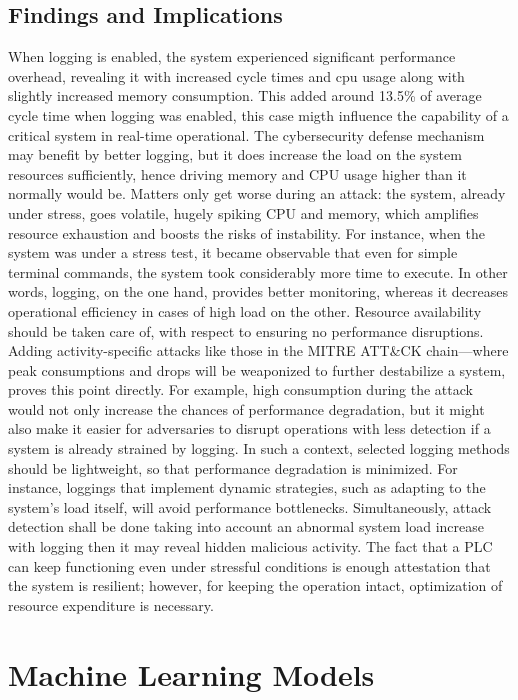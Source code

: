 \documentclass[Master,BMR,english]{twbook}
\begin{document}
\subsection{Findings and Implications}

When logging is enabled, the system experienced significant performance overhead, revealing it with increased cycle times and cpu usage along with slightly increased memory consumption. This added around 13.5\% of average cycle time when logging was enabled, this case migth influence the capability of a critical system in real-time operational. The cybersecurity defense mechanism may benefit by better logging, but it does increase the load on the system resources sufficiently, hence driving memory and CPU usage higher than it normally would be. Matters only get worse during an attack: the system, already under stress, goes volatile, hugely spiking CPU and memory, which amplifies resource exhaustion and boosts the risks of instability. For instance, when the system was under a stress test, it became observable that even for simple terminal commands, the system took considerably more time to execute. In other words, logging, on the one hand, provides better monitoring, whereas it decreases operational efficiency in cases of high load on the other. Resource availability should be taken care of, with respect to ensuring no performance disruptions. Adding activity-specific attacks like those in the MITRE ATT\&CK chain—where peak consumptions and drops will be weaponized to further destabilize a system, proves this point directly. For example, high consumption during the attack would not only increase the chances of performance degradation, but it might also make it easier for adversaries to disrupt operations with less detection if a system is already strained by logging. In such a context, selected logging methods should be lightweight, so that performance degradation is minimized. For instance, loggings that implement dynamic strategies, such as adapting to the system's load itself, will avoid performance bottlenecks. Simultaneously, attack detection shall be done taking into account an abnormal system load increase with logging then it may reveal hidden malicious activity. The fact that a PLC can keep functioning even under stressful conditions is enough attestation that the system is resilient; however, for keeping the operation intact, optimization of resource expenditure is necessary.





\section{Machine Learning Models}
\end{document}
